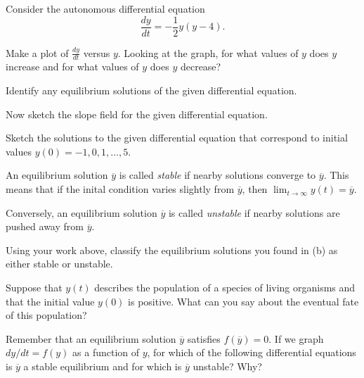\begin{marginfigure}[6cm]
\end{marginfigure}

\begin{marginfigure}[1cm]
\end{marginfigure}

\begin{activity} \label{A:7.2.1}  
Consider the autonomous differential equation 
$$ \frac{dy}{dt} = -\frac 12 y(y-4). $$

\ba
\item Make a plot of $\frac{dy}{dt}$ versus $y$.  Looking at the
  graph, for what values of $y$ does $y$ increase and for what values of $y$
  does $y$ decrease?

\item Identify any equilibrium solutions of the given differential equation.

\item Now sketch the slope field for the given differential equation.

\item  Sketch the solutions to the given differential equation that correspond to initial values $y(0)=-1, 0, 1, \ldots, 5$.

\item  An equilibrium solution $\overline{y}$ is called {\em stable}  
  if nearby 
  solutions converge to $\overline{y}$.  This means that if the inital
  condition varies slightly from $\overline{y}$, then
  $\lim_{t\to\infty}y(t) = \overline{y}$.  

  Conversely, an equilibrium solution $\overline{y}$ 
  is called {\em unstable}   if nearby solutions are pushed away from
  $\overline{y}$.

  Using your work above, classify the equilibrium solutions you found in (b)
  as either stable or unstable.

\item Suppose that $y(t)$ describes the population of a species of
  living organisms and that the initial value $y(0)$ is positive.  What can you
  say about the eventual fate of this population?  

\item  Remember that an equilibrium solution $\overline{y}$ satisfies
  $f(\overline{y}) = 0$.  If we graph $dy/dt = f(y)$ as a function of
  $y$, for which of the following differential equations is
  $\overline{y}$ a stable equilibrium and for which is $\overline{y}$ unstable?  Why?


\end{activity}
